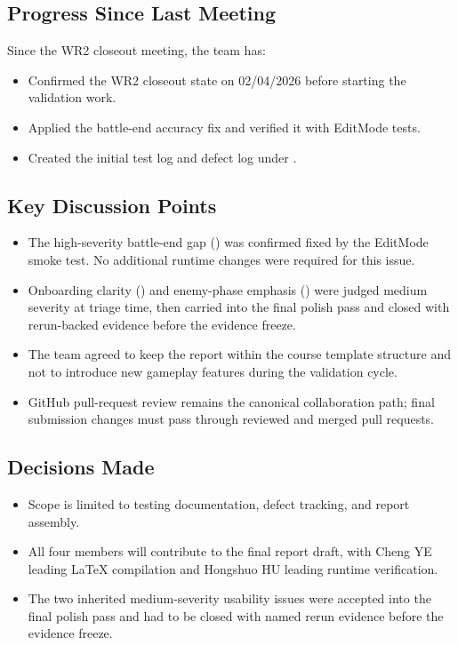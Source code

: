 \subsection{Progress Since Last Meeting}

Since the WR2 closeout meeting, the team has:

\begin{itemize}
    \item Confirmed the WR2 closeout state on 02/04/2026 before starting the validation work.
    \item Applied the battle-end accuracy fix and verified it with EditMode tests.
    \item Created the initial test log and defect log under .
\end{itemize}

\subsection{Key Discussion Points}

\begin{itemize}
    \item The high-severity battle-end gap () was confirmed fixed by the EditMode smoke test. No additional runtime changes were required for this issue.
    \item Onboarding clarity () and enemy-phase emphasis () were judged medium severity at triage time, then carried into the final polish pass and closed with rerun-backed evidence before the evidence freeze.
    \item The team agreed to keep the report within the course template structure and not to introduce new gameplay features during the validation cycle.
    \item GitHub pull-request review remains the canonical collaboration path; final submission changes must pass through reviewed and merged pull requests.
\end{itemize}

\subsection{Decisions Made}

\begin{itemize}
    \item Scope is limited to testing documentation, defect tracking, and report assembly.
    \item All four members will contribute to the final report draft, with Cheng YE leading LaTeX compilation and Hongshuo HU leading runtime verification.
    \item The two inherited medium-severity usability issues were accepted into the final polish pass and had to be closed with named rerun evidence before the evidence freeze.
\end{itemize}

